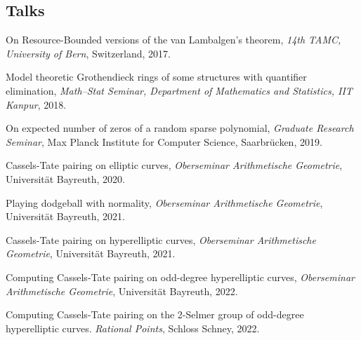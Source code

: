 \documentclass[margin,line]{resume}
\begin{document}
\begin{resume}
\section{\mysidestyle Talks}
\begin{list2}
        \item On Resource-Bounded versions of the van Lambalgen's theorem, \emph{14th TAMC, University of Bern}, Switzerland, 2017.\vspace{1.5mm}
        \item Model theoretic Grothendieck rings of some  structures with quantifier elimination, \emph{Math--Stat Seminar, Department of Mathematics and Statistics, IIT Kanpur}, 2018.\vspace{1.5mm}
        \item On expected number of zeros of a random sparse polynomial, \emph{Graduate Research Seminar}, Max Planck Institute for Computer Science, Saarbr\"{u}cken, 2019.\vspace{1.5mm}
        \item Cassels-Tate pairing on elliptic curves, 
        \emph{Oberseminar Arithmetische Geometrie}, Universit\"{a}t Bayreuth, 2020.
         \vspace{1.5mm}
        \item Playing dodgeball with normality,
        \emph{Oberseminar Arithmetische Geometrie}, Universit\"{a}t Bayreuth, 2021.\vspace{1.5mm}
        \item Cassels-Tate pairing on hyperelliptic curves,
        \emph{Oberseminar Arithmetische Geometrie}, Universit\"{a}t Bayreuth, 2021.
        \item Computing Cassels-Tate pairing on odd-degree hyperelliptic curves,
        \emph{Oberseminar Arithmetische Geometrie}, Universit\"{a}t Bayreuth, 2022.
	\item Computing Cassels-Tate pairing on the 2-Selmer group of odd-degree hyperelliptic curves.
		\emph{Rational Points}, Schloss Schney, 2022.
\end{list2}
\begin{comment}
	\section{\mysidestyle Research Projects \&\\Experiences}


\end{comment}
\end{resume}
\end{document}
